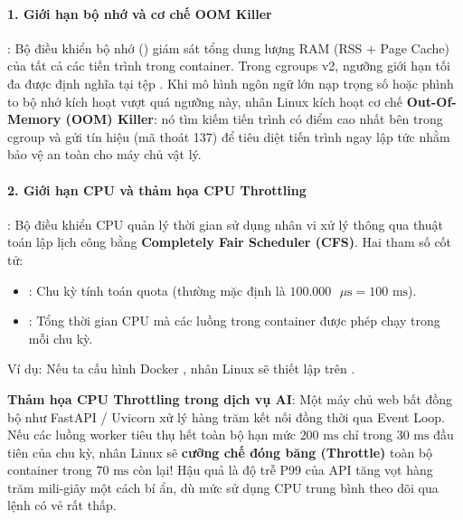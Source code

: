 \paragraph{1. Giới hạn bộ nhớ và cơ chế OOM Killer}:
Bộ điều khiển bộ nhớ () giám sát tổng dung lượng RAM (RSS + Page Cache) của tất cả các tiến trình trong container. Trong cgroups v2, ngưỡng giới hạn tối đa được định nghĩa tại tệp . Khi mô hình ngôn ngữ lớn nạp trọng số hoặc phình to bộ nhớ kích hoạt vượt quá ngưỡng này, nhân Linux kích hoạt cơ chế \textbf{Out-Of-Memory (OOM) Killer}: nó tìm kiếm tiến trình có điểm  cao nhất bên trong cgroup và gửi tín hiệu  (mã thoát 137) để tiêu diệt tiến trình ngay lập tức nhằm bảo vệ an toàn cho máy chủ vật lý.

\paragraph{2. Giới hạn CPU và thảm họa CPU Throttling}:
Bộ điều khiển CPU quản lý thời gian sử dụng nhân vi xử lý thông qua thuật toán lập lịch công bằng \textbf{Completely Fair Scheduler (CFS)}. Hai tham số cốt tử:
\begin{itemize}
  \item {}: Chu kỳ tính toán quota (thường mặc định là $100.000\text{ }\mu\text{s} = 100\text{ ms}$).
  \item {}: Tổng thời gian CPU mà các luồng trong container được phép chạy trong mỗi chu kỳ.
\end{itemize}
Ví dụ: Nếu ta cấu hình Docker , nhân Linux sẽ thiết lập  trên .
\begin{note}
\textbf{Thảm họa CPU Throttling trong dịch vụ AI}: Một máy chủ web bất đồng bộ như FastAPI / Uvicorn xử lý hàng trăm kết nối đồng thời qua Event Loop. Nếu các luồng worker tiêu thụ hết toàn bộ hạn mức $200\text{ ms}$ chỉ trong $30\text{ ms}$ đầu tiên của chu kỳ, nhân Linux sẽ \textbf{cưỡng chế đóng băng (Throttle)} toàn bộ container trong $70\text{ ms}$ còn lại! Hậu quả là độ trễ P99 của API tăng vọt hàng trăm mili-giây một cách bí ẩn, dù mức sử dụng CPU trung bình theo dõi qua lệnh  có vẻ rất thấp.
\end{note}

